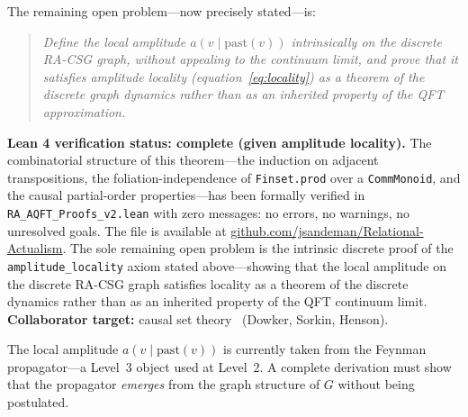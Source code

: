 \documentclass[11pt,a4paper]{article}
\theoremstyle{plain}
\theoremstyle{definition}
\theoremstyle{remark}
\begin{document}
\begin{description}
  The remaining open problem---now precisely stated---is:
  \begin{quotation}
  \noindent\textit{Define the local amplitude $a(v \mid \mathrm{past}(v))$
  intrinsically on the discrete RA-CSG graph, without appealing to the
  continuum limit, and prove that it satisfies amplitude locality
  (equation~\eqref{eq:locality}) as a theorem of the discrete graph dynamics
  rather than as an inherited property of the QFT approximation.}
  \end{quotation}
  \textbf{Lean 4 verification status: complete (given amplitude locality).}
  The combinatorial structure of this theorem---the induction on adjacent
  transpositions, the foliation-independence of \texttt{Finset.prod} over a
  \texttt{CommMonoid}, and the causal partial-order properties---has been
  formally verified in \texttt{RA\_AQFT\_Proofs\_v2.lean} with zero messages:
  no errors, no warnings, no unresolved goals. The file is available at
  \href{https://github.com/jsandeman/Relational-Actualism}{github.com/jsandeman/Relational-Actualism}.
  The sole remaining open problem is the intrinsic discrete proof of the
  \texttt{amplitude\_locality} axiom stated above---showing that the local
  amplitude on the discrete RA-CSG graph satisfies locality as a theorem
  of the discrete dynamics rather than as an inherited property of the QFT
  continuum limit.
  \textbf{Collaborator target:} causal set theory~\citep{Dowker2005,RideoutSorkin2000} (Dowker, Sorkin, Henson).

  \item[Hard Wall 2: Derivation of Local Amplitudes and the Generative Measure.]
  The local amplitude $a(v \mid \mathrm{past}(v))$ is currently taken from
  the Feynman propagator---a Level~3 object used at Level~2. A complete
  derivation must show that the propagator \emph{emerges} from the graph
  structure of $G$ without being postulated.


\end{description}
\end{document}
